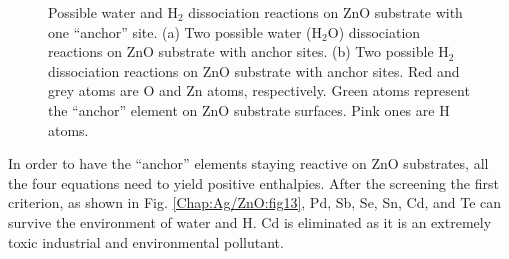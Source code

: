 \newpage
\begingroup
\begin{figure}[!ht]
  \centering
  \label{Chap:Ag/ZnO:fig:12a}
  \label{Chap:Ag/ZnO:fig:12b}
\caption[Possible water and $\text{H}_{\text{2}}$ dissociation reactions on ZnO substrate with ``anchor'' sites.]{Possible water and $\text{H}_{\text{2}}$ dissociation reactions on ZnO substrate with one ``anchor'' site. (a) Two possible water ($\text{H}_{\text{2}}\text{O}$) dissociation reactions on ZnO substrate with anchor sites. (b) Two possible $\text{H}_{\text{2}}$ dissociation reactions on ZnO substrate with anchor sites. Red and grey atoms are O and Zn atoms, respectively. Green atoms represent the ``anchor'' element on ZnO substrate surfaces. Pink ones are H atoms.}
\label{Chap:Ag/ZnO:fig12}
\end{figure}
\endgroup

In order to have the ``anchor'' elements staying reactive on ZnO substrates, all the four equations need to yield positive enthalpies. After the screening the first criterion, as shown in Fig. \ref{Chap:Ag/ZnO:fig13}, Pd, Sb, Se, Sn, Cd, and Te can survive the environment of water and H. Cd is eliminated as it is an extremely toxic industrial and environmental pollutant. 

